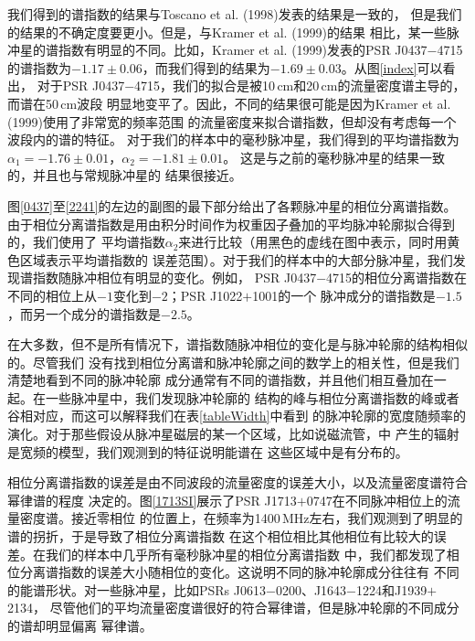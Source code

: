 我们得到的谱指数的结果与Toscano et al. (1998)\supercite{Toscano98}发表的结果是一致的，
但是我们的结果的不确定度要更小。但是，与Kramer et al. (1999)\supercite{Kramer99}的结果
相比，某一些脉冲星的谱指数有明显的不同。比如，Kramer et al. (1999)发表的PSR J0437$-$4715
的谱指数为$-1.17\pm0.06$，而我们得到的结果为$-1.69\pm0.03$。从图\ref{index}可以看出，
对于PSR J0437$-$4715，我们的拟合是被10\,cm和20\,cm的流量密度谱主导的，而谱在50\,cm波段
明显地变平了。因此，不同的结果很可能是因为Kramer et al. (1999)使用了非常宽的频率范围
的流量密度来拟合谱指数，但却没有考虑每一个波段内的谱的特征。
%
对于我们的样本中的毫秒脉冲星，我们得到的平均谱指数为$\alpha_1=-1.76\pm0.01$，$\alpha_2=-1.81\pm0.01$。
这是与之前的毫秒脉冲星的结果一致的\supercite{Toscano98,Kramer99}，并且也与常规脉冲星的
结果很接近\supercite{Lorimer95,Maron00}。

图\ref{0437}至\ref{2241}的左边的副图的最下部分给出了各颗脉冲星的相位分离谱指数。
由于相位分离谱指数是用由积分时间作为权重因子叠加的平均脉冲轮廓拟合得到的，我们使用了
平均谱指数$\alpha_2$来进行比较（用黑色的虚线在图中表示，同时用黄色区域表示平均谱指数的
误差范围）。对于我们的样本中的大部分脉冲星，我们发现谱指数随脉冲相位有明显的变化。例如，
PSR J0437$-$4715的相位分离谱指数在不同的相位上从$-1$变化到$-2$；PSR J1022$+$1001的一个
脉冲成分的谱指数是$-1.5$，而另一个成分的谱指数是$-2.5$。

在大多数，但不是所有情况下，谱指数随脉冲相位的变化是与脉冲轮廓的结构相似的。尽管我们
没有找到相位分离谱和脉冲轮廓之间的数学上的相关性，但是我们清楚地看到不同的脉冲轮廓
成分通常有不同的谱指数，并且他们相互叠加在一起。在一些脉冲星中，我们发现脉冲轮廓的
结构的峰与相位分离谱指数的峰或者谷相对应，而这可以解释我们在表\ref{tableWidth}中看到
的脉冲轮廓的宽度随频率的演化。对于那些假设从脉冲星磁层的某一个区域，比如说磁流管，中
产生的辐射是宽频的模型\supercite{Michel87,Dyks10,Wang14}，我们观测到的特征说明能谱在
这些区域中是有分布的。

相位分离谱指数的误差是由不同波段的流量密度的误差大小，以及流量密度谱符合幂律谱的程度
决定的。图\ref{1713SI}展示了PSR J1713$+$0747在不同脉冲相位上的流量密度谱。接近零相位
的位置上，在频率为1400\,MHz左右，我们观测到了明显的谱的拐折，于是导致了相位分离谱指数
在这个相位相比其他相位有比较大的误差。在我们的样本中几乎所有毫秒脉冲星的相位分离谱指数
中，我们都发现了相位分离谱指数的误差大小随相位的变化。这说明不同的脉冲轮廓成分往往有
不同的能谱形状。对一些脉冲星，比如PSRs J0613$-$0200、J1643$-$1224和J1939$+$2134，
尽管他们的平均流量密度谱很好的符合幂律谱，但是脉冲轮廓的不同成分的谱却明显偏离
幂律谱。


